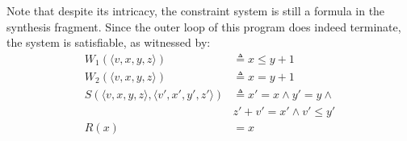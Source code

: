 \documentclass[preprint]{sigplanconf}
\theoremstyle{definition}
\begin{document}

Note that despite its intricacy, the constraint system is still a formula in the synthesis fragment.
Since the outer loop of this program does indeed terminate, the system is satisfiable, as witnessed by:
\begin{align*}
W_1(\langle v, x, y, z \rangle ) & \triangleq x \leq y + 1 \\
W_2(\langle v, x, y, z \rangle ) & \triangleq x = y + 1 \\
S(\langle v, x, y, z \rangle, \langle v', x', y', z' \rangle) & \triangleq x ' = x \wedge y' = y \wedge \\
& z' + v' = x' \wedge v' \leq y' \\
R(x) & = x
\end{align*}
\end{document}
